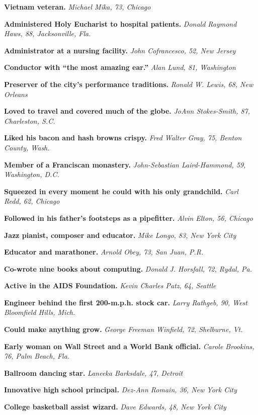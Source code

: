 \textbf{Vietnam veteran.} \emph{Michael Mika, 73, Chicago}

\textbf{Administered Holy Eucharist to hospital patients.} \emph{Donald
Raymond Haws, 88, Jacksonville, Fla.}

\textbf{Administrator at a nursing facility.} \emph{John Cofrancesco,
52, New Jersey}

\textbf{Conductor with ``the most amazing ear.''} \emph{Alan Lund, 81,
Washington}

\textbf{Preserver of the city's performance traditions.} \emph{Ronald W.
Lewis, 68, New Orleans}

\textbf{Loved to travel and covered much of the globe.} \emph{JoAnn
Stokes-Smith, 87, Charleston, S.C.}

\textbf{Liked his bacon and hash browns crispy.} \emph{Fred Walter Gray,
75, Benton County, Wash.}

\textbf{Member of a Franciscan monastery.} \emph{John-Sebastian
Laird-Hammond, 59, Washington, D.C.}

\textbf{Squeezed in every moment he could with his only grandchild.}
\emph{Carl Redd, 62, Chicago}

\textbf{Followed in his father's footsteps as a pipefitter.} \emph{Alvin
Elton, 56, Chicago}

\textbf{Jazz pianist, composer and educator.} \emph{Mike Longo, 83, New
York City}

\textbf{Educator and marathoner.} \emph{Arnold Obey, 73, San Juan, P.R.}

\textbf{Co-wrote nine books about computing.} \emph{Donald J. Horsfall,
72, Rydal, Pa.}

\textbf{Active in the AIDS Foundation.} \emph{Kevin Charles Patz, 64,
Seattle}

\textbf{Engineer behind the first 200-m.p.h. stock car.} \emph{Larry
Rathgeb, 90, West Bloomfield Hills, Mich.}

\textbf{Could make anything grow.} \emph{George Freeman Winfield, 72,
Shelburne, Vt.}

\textbf{Early woman on Wall Street and a World Bank official.}
\emph{Carole Brookins, 76, Palm Beach, Fla.}

\textbf{Ballroom dancing star.} \emph{Laneeka Barksdale, 47, Detroit}

\textbf{Innovative high school principal.} \emph{Dez-Ann Romain, 36, New
York City}

\textbf{College basketball assist wizard.} \emph{Dave Edwards, 48, New
York City}

